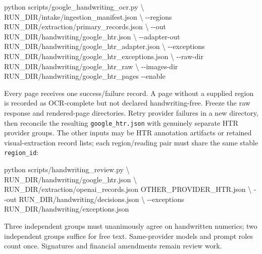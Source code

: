 \documentclass[
]{article}
\newenvironment{Shaded}{}{}
\newcommand{\AttributeTok}[1]{\textcolor[rgb]{0.49,0.56,0.16}{#1}}
\newcommand{\DataTypeTok}[1]{\textcolor[rgb]{0.56,0.13,0.00}{#1}}
\newcommand{\ExtensionTok}[1]{#1}
\newcommand{\NormalTok}[1]{#1}
\begin{document}
\begin{Shaded}
\begin{Highlighting}[]
\ExtensionTok{python}\NormalTok{ scripts/google\_handwriting\_ocr.py }\DataTypeTok{\textbackslash{}}
\NormalTok{  RUN\_DIR/intake/ingestion\_manifest.json }\DataTypeTok{\textbackslash{}}
  \AttributeTok{{-}{-}regions}\NormalTok{ RUN\_DIR/extraction/primary\_records.json }\DataTypeTok{\textbackslash{}}
  \AttributeTok{{-}{-}out}\NormalTok{ RUN\_DIR/handwriting/google\_htr.json }\DataTypeTok{\textbackslash{}}
  \AttributeTok{{-}{-}adapter{-}out}\NormalTok{ RUN\_DIR/handwriting/google\_htr\_adapter.json }\DataTypeTok{\textbackslash{}}
  \AttributeTok{{-}{-}exceptions}\NormalTok{ RUN\_DIR/handwriting/google\_htr\_exceptions.json }\DataTypeTok{\textbackslash{}}
  \AttributeTok{{-}{-}raw{-}dir}\NormalTok{ RUN\_DIR/handwriting/google\_htr\_raw }\DataTypeTok{\textbackslash{}}
  \AttributeTok{{-}{-}images{-}dir}\NormalTok{ RUN\_DIR/handwriting/google\_htr\_pages }\AttributeTok{{-}{-}enable}
\end{Highlighting}
\end{Shaded}

Every page receives one success/failure record. A page without a
supplied region is recorded as OCR-complete but not declared
handwriting-free. Freeze the raw response and rendered-page directories.
Retry provider failures in a new directory, then reconcile the resulting
\texttt{google\_\allowbreak{}htr.json} with genuinely separate HTR
provider groups. The other inputs may be HTR annotation artifacts or
retained visual-extraction record lists; each region/reading pair must
share the same stable \texttt{region\_\allowbreak{}id}:

\begin{Shaded}
\begin{Highlighting}[]
\ExtensionTok{python}\NormalTok{ scripts/handwriting\_review.py }\DataTypeTok{\textbackslash{}}
\NormalTok{  RUN\_DIR/handwriting/google\_htr.json }\DataTypeTok{\textbackslash{}}
\NormalTok{  RUN\_DIR/extraction/openai\_records.json OTHER\_PROVIDER\_HTR.json }\DataTypeTok{\textbackslash{}}
  \AttributeTok{{-}{-}out}\NormalTok{ RUN\_DIR/handwriting/decisions.json }\DataTypeTok{\textbackslash{}}
  \AttributeTok{{-}{-}exceptions}\NormalTok{ RUN\_DIR/handwriting/exceptions.json}
\end{Highlighting}
\end{Shaded}

Three independent groups must unanimously agree on handwritten numerics;
two independent groups suffice for free text. Same-provider models and
prompt roles count once. Signatures and financial amendments remain
review work.
\end{document}

